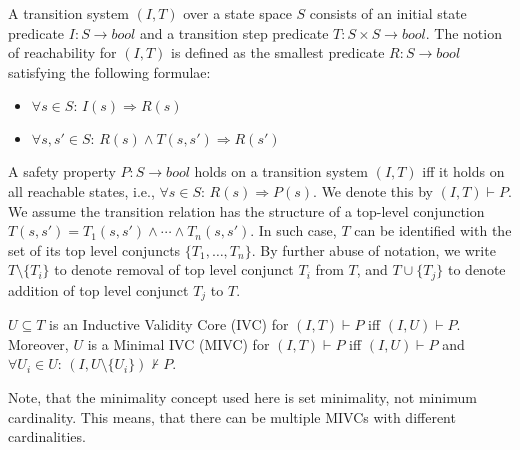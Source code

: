 A transition system $(I,T)$ over a state space $S$ consists of an initial state predicate $I : S \rightarrow bool$ and a transition step predicate $T : S \times S \rightarrow bool$. The notion of reachability for $(I, T)$ is defined as the smallest predicate $R : S \rightarrow bool$ satisfying the following formulae:

\begin{itemize}
	\item[] $\forall s \in S: \, I(s) \Rightarrow R(s)$
	\item[] $\forall s, s' \in S: \, R(s) \wedge T(s, s') \Rightarrow R(s')$
\end{itemize}

A safety property $P: S \rightarrow bool$ holds on a transition system $(I, T)$ iff it holds on all reachable states, i.e., $\forall s \in S: \, R(s) \Rightarrow P(s)$. We denote this by $(I, T) \vdash P$. We assume
the transition relation has the structure of a top-level conjunction $T(s, s') = T_1(s, s') \wedge \cdots \wedge T_n(s, s')$. In such case, $T$ can be identified with the set of its top level conjuncts $\{ T_1, \ldots, T_n\}$. By further abuse of notation, we write $T \setminus \{ T_i \}$ to denote removal of top level conjunct $T_i$ from $T$, and $T \cup \{ T_j\}$ to denote addition of top level conjunct $T_j$ to $T$. 


\begin{definition}
$U \subseteq T$ is an Inductive Validity Core (IVC) for $(I, T) \vdash P$ iff $(I, U) \vdash P$. Moreover, $U$ is a Minimal IVC (MIVC) for $(I, T) \vdash P$ iff $(I, U) \vdash P$ and $\forall U_i \in U: \, (I, U \setminus \{ U_i\}) \nvdash P$.
\end{definition}

Note, that the minimality concept used here is set minimality, not minimum cardinality. This means, that there can be multiple MIVCs with different cardinalities. 






